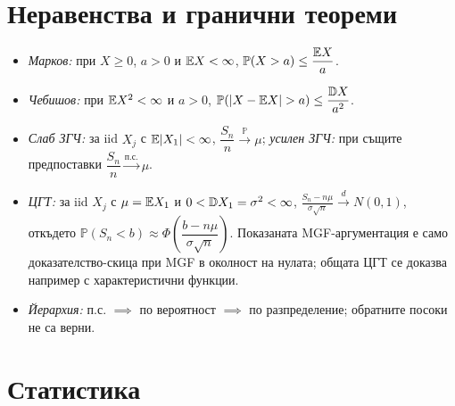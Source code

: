 \section{Неравенства и гранични теореми}

\begin{itemize}\itemsep2pt
  \item \emph{Марков:} при $X \ge 0$, $a>0$ и $\mathbb{E} X<\infty$,
        $\mathbb{P}(X > a) \le \dfrac{\mathbb{E} X}{a}$.
  \item \emph{Чебишов:} при $\mathbb{E} X^2<\infty$ и $a>0$,
        $\mathbb{P}(|X - \mathbb{E} X| > a) \le \dfrac{\mathbb{D} X}{a^2}$.
  \item \emph{Слаб ЗГЧ:} за iid $X_j$ с $\mathbb{E}|X_1|<\infty$,
        $\dfrac{S_n}{n} \xrightarrow{\mathbb{P}} \mu$;\quad
        \emph{усилен ЗГЧ:} при същите предпоставки
        $\dfrac{S_n}{n} \xrightarrow{\text{п.с.}} \mu$.
  \item \emph{ЦГТ:} за iid $X_j$ с $\mu=\mathbb{E} X_1$ и $0<\mathbb{D} X_1=\sigma^2<\infty$,
        $\displaystyle \frac{S_n - n\mu}{\sigma\sqrt{n}} \xrightarrow{d} N(0,1)$, откъдето
        $\mathbb{P}(S_n < b) \approx \Phi\!\left(\dfrac{b-n\mu}{\sigma\sqrt{n}}\right)$.
        Показаната MGF-аргументация е само доказателство-скица при MGF в
        околност на нулата; общата ЦГТ се доказва например с характеристични функции.
  \item \emph{Йерархия:} п.с. $\implies$ по вероятност $\implies$ по разпределение;
        обратните посоки не са верни.
\end{itemize}

\section{Статистика}

